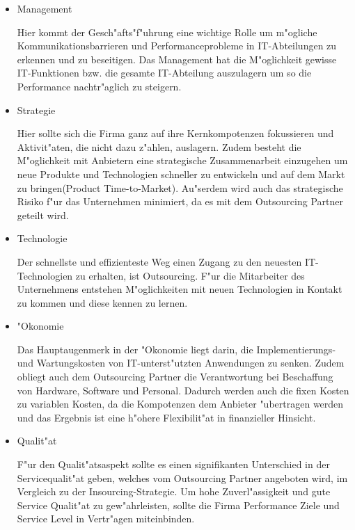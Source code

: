 \begin{itemize}
	\item Management
	
	Hier kommt der Gesch"afts"f"uhrung eine wichtige Rolle um m"ogliche Kommunikationsbarrieren und Performanceprobleme in IT-Abteilungen zu erkennen und zu beseitigen. Das Management hat die M"oglichkeit gewisse IT-Funktionen bzw. die gesamte IT-Abteilung auszulagern um so die Performance nachtr"aglich zu steigern.
	\item Strategie
	
	Hier sollte sich die Firma ganz auf ihre Kernkompotenzen fokussieren und Aktivit"aten, die nicht dazu z"ahlen, auslagern. Zudem besteht die M"oglichkeit mit Anbietern eine strategische Zusammenarbeit einzugehen um neue Produkte und Technologien schneller zu entwickeln und auf dem Markt zu bringen(Product Time-to-Market). Au"serdem wird auch das strategische Risiko f"ur das Unternehmen minimiert, da es mit dem Outsourcing Partner geteilt wird.
	
	\item Technologie
	
	Der schnellste und effizienteste Weg einen Zugang zu den neuesten IT-Technologien zu erhalten, ist Outsourcing. F"ur die Mitarbeiter des Unternehmens entstehen M"oglichkeiten mit neuen Technologien in Kontakt zu kommen und diese kennen zu lernen.
	
	\item "Okonomie
	
	Das Hauptaugenmerk in der "Okonomie liegt darin, die Implementierungs- und Wartungskosten von IT-unterst"utzten Anwendungen zu senken. Zudem obliegt auch dem Outsourcing Partner die Verantwortung bei Beschaffung von Hardware, Software und Personal. Dadurch werden auch die fixen Kosten zu variablen Kosten, da die Kompotenzen dem Anbieter "ubertragen werden und das Ergebnis ist eine h"ohere Flexibilit"at in finanzieller Hinsicht. 
	
	\item Qualit"at
	
	F"ur den Qualit"atsaspekt sollte es einen signifikanten Unterschied in der Servicequalit"at geben, welches vom Outsourcing Partner angeboten wird, im Vergleich zu der Insourcing-Strategie. Um hohe Zuverl"assigkeit und gute Service Qualit"at zu gew"ahrleisten, sollte die Firma Performance Ziele und Service Level in Vertr"agen miteinbinden.
\end{itemize}
	
